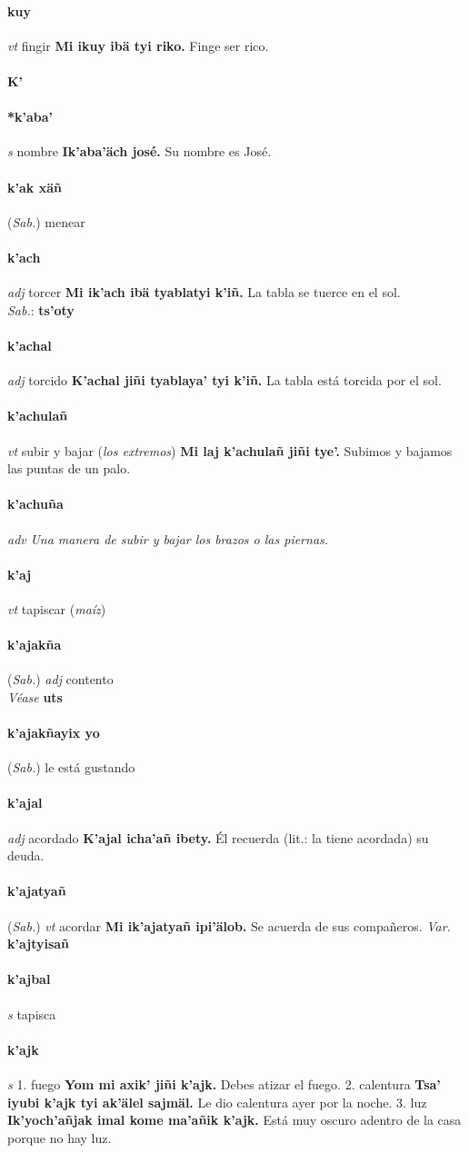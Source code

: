 \documentclass{scrbook}
\newcommand{\entry}[1]{\paragraph{#1}}
\newcommand{\alphaletter}[1]{\addsec{#1}}
\newcommand{\onedefinition}[1]{#1.}
\newcommand{\nontranslationdef}[1]{\textit{#1}}
\newcommand{\partofspeech}[1]{\textit{#1}}
\newcommand{\spanishtranslation}[1]{#1}
\newcommand{\clarification}[1]{(\textit{#1})}
\newcommand{\cholexample}[1]{\textbf{#1}}
\newcommand{\exampletranslation}[1]{#1}
\newcommand{\dialectvariant}[1]{\\\textit{#1}:}
\newcommand{\dialectword}[1]{\textbf{#1}}
\newcommand{\alsosee}[1]{\\\textit{Véase} \textbf{#1}}
\newcommand{\relevantdialect}[1]{(\textit{#1})}
\newcommand{\variation}[1]{\textit{Var.} \textbf{#1}}
\begin{document}
\begin{multicols}{2}
\entry{kuy}
\partofspeech{vt}
\spanishtranslation{fingir}
\cholexample{Mi ikuy ibä tyi riko.}
\exampletranslation{Finge ser rico.}

\entry{K'}
\alphaletter{K'}

\entry{*k'aba'}
\partofspeech{s}
\spanishtranslation{nombre}
\cholexample{Ik'aba'äch josé.}
\exampletranslation{Su nombre es José.}

\entry{k'ak xäñ}
\relevantdialect{Sab.}
\spanishtranslation{menear}

\entry{k'ach}
\partofspeech{adj}
\spanishtranslation{torcer}
\cholexample{Mi ik'ach ibä tyablatyi k'iñ.}
\exampletranslation{La tabla se tuerce en el sol.}
\dialectvariant{Sab.}
\dialectword{ts'oty}

\entry{k'achal}
\partofspeech{adj}
\spanishtranslation{torcido}
\cholexample{K'achal jiñi tyablaya' tyi k'iñ.}
\exampletranslation{La tabla está torcida por el sol.}

\entry{k'achulañ}
\partofspeech{vt}
\spanishtranslation{subir y bajar}
\clarification{los extremos}
\cholexample{Mi laj k'achulañ jiñi tye'.}
\exampletranslation{Subimos y bajamos las puntas de un palo.}

\entry{k'achuña}
\partofspeech{adv}
\nontranslationdef{Una manera de subir y bajar los brazos o las piernas.}

\entry{k'aj}
\partofspeech{vt}
\spanishtranslation{tapiscar}
\clarification{maíz}

\entry{k'ajakña}
\relevantdialect{Sab.}
\partofspeech{adj}
\spanishtranslation{contento}
\alsosee{uts}

\entry{k'ajakñayix yo}
\relevantdialect{Sab.}
\spanishtranslation{le está gustando}

\entry{k'ajal}
\partofspeech{adj}
\spanishtranslation{acordado}
\cholexample{K'ajal icha'añ ibety.}
\exampletranslation{Él recuerda (lit.: la tiene acordada) su deuda.}

\entry{k'ajatyañ}
\relevantdialect{Sab.}
\partofspeech{vt}
\spanishtranslation{acordar}
\cholexample{Mi ik'ajatyañ ipi'älob.}
\exampletranslation{Se acuerda de sus compañeros.}
\variation{k'ajtyisañ}

\entry{k'ajbal}
\partofspeech{s}
\spanishtranslation{tapisca}

\entry{k'ajk}
\partofspeech{s}
\onedefinition{1}
\spanishtranslation{fuego}
\cholexample{Yom mi axik' jiñi k'ajk.}
\exampletranslation{Debes atizar el fuego.}
\onedefinition{2}
\spanishtranslation{calentura}
\cholexample{Tsa' iyubi k'ajk tyi ak'älel sajmäl.}
\exampletranslation{Le dio calentura ayer por la noche.}
\onedefinition{3}
\spanishtranslation{luz}
\cholexample{Ik'yoch'añjak imal kome ma'añik k'ajk.}
\exampletranslation{Está muy oscuro adentro de la casa porque no hay luz.}


\end{multicols}
\end{document}
